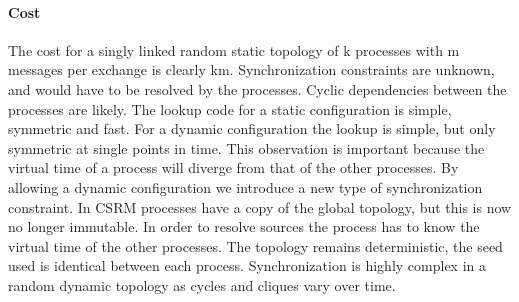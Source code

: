 \paragraph{Cost}
The cost for a singly linked random static topology of k processes with m messages per exchange is clearly km. Synchronization constraints are unknown, and would have to be resolved by the processes. Cyclic dependencies between the processes are likely.
The lookup code for a static configuration is simple, symmetric and fast. For a dynamic configuration the lookup is simple, but only symmetric at single points in time. This observation is important because the virtual time of a process will diverge from that of the other processes. By allowing a dynamic configuration we introduce a new type of synchronization constraint. In CSRM processes have a copy of the global topology, but this is now no longer immutable. In order to resolve sources the process has to know the virtual time of the other processes. The topology remains deterministic, the seed used is identical between each process. Synchronization is highly complex in a random dynamic topology as cycles and cliques vary over time.

